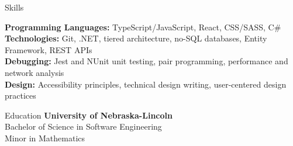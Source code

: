 \documentclass[
	11pt, %
]{resume} %
\begin{document}
\begin{rSection}{Skills}

	\textbf{Programming Languages:} TypeScript/JavaScript, React, CSS/SASS, C\# \\
	\textbf{Technologies:} Git, .NET, tiered architecture, no-SQL databases, Entity Framework, REST APIs \\
	\textbf{Debugging:} Jest and NUnit unit testing, pair programming, performance and network analysis \\
	\textbf{Design:} Accessibility principles, technical design writing, user-centered design practices

\end{rSection}

\begin{rSection}{Education}
	\textbf{University of Nebraska-Lincoln} \\
	Bachelor of Science in Software Engineering \\
	Minor in Mathematics
\end{rSection}





\end{document}
